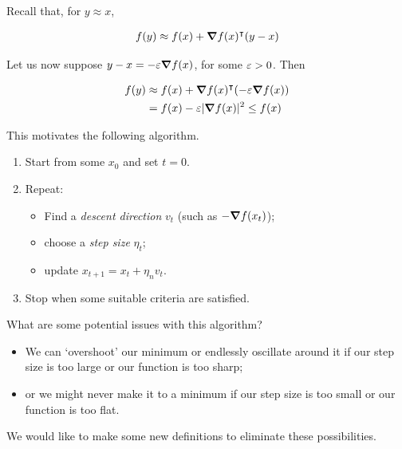 \documentclass{../template/note}
\begin{document}
    Recall that, for \(y \approx x\),

    \begin{align*}
        f(y) \approx f(x) + \grad f(x)^\intercal (y-x)
    \end{align*}
    
    Let us now suppose $y-x = -\eps\grad f(x)$, for some $\varepsilon > 0$. Then

    \begin{align*}
        f(y) &\approx f(x) + \grad f(x)^\intercal (-\eps \grad f(x)) \\
        &= f(x) - \eps |\grad f(x)|^2 \leq f(x)
    \end{align*}
    
    This motivates the following algorithm.

    \begin{algorithm}
        \begin{enumerate}[label=\protect\circled{\arabic*}]
            \item Start from some $x_0$ and set $t=0$.
            \item Repeat:
            \begin{itemize}
                \item Find a \emph{descent direction} $v_t$ (such as $-\grad f(x_t)$);
                \item choose a \emph{step size} $\eta_t$;
                \item update $x_{t+1} = x_t + \eta_n v_t$.
            \end{itemize}
            \item Stop when some suitable criteria are satisfied.
        \end{enumerate}
    \end{algorithm}
    
    What are some potential issues with this algorithm?

    \begin{itemize}
        \item We can `overshoot' our minimum or endlessly oscillate around it if our step size is too large or our function is too sharp;
        \item or we might never make it to a minimum if our step size is too small or our function is too flat.
    \end{itemize}
    
    We would like to make some new definitions to eliminate these possibilities.
\end{document}
